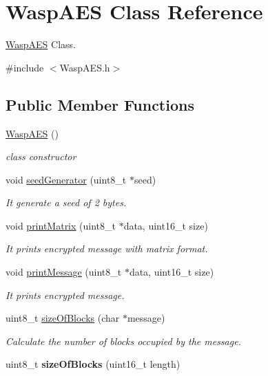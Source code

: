 \hypertarget{class_wasp_a_e_s}{}\section{Wasp\+A\+ES Class Reference}
\label{class_wasp_a_e_s}


\hyperlink{class_wasp_a_e_s}{Wasp\+A\+ES} Class.  




{\ttfamily \#include $<$Wasp\+A\+E\+S.\+h$>$}

\subsection*{Public Member Functions}
\begin{DoxyCompactItemize}
\item 
\hyperlink{class_wasp_a_e_s_a2b1ec7f2140235bf7afdb48e28346128}{Wasp\+A\+ES} ()
\begin{DoxyCompactList}\small\item\em class constructor \end{DoxyCompactList}\item 
void \hyperlink{class_wasp_a_e_s_af1dce4d0b180e349d5b9acac8cc924e6}{seed\+Generator} (uint8\+\_\+t $\ast$seed)
\begin{DoxyCompactList}\small\item\em It generate a seed of 2 bytes. \end{DoxyCompactList}\item 
void \hyperlink{class_wasp_a_e_s_a75819acddbbc5bd70e2b2c48dffabeb3}{print\+Matrix} (uint8\+\_\+t $\ast$data, uint16\+\_\+t size)
\begin{DoxyCompactList}\small\item\em It prints encrypted message with matrix format. \end{DoxyCompactList}\item 
void \hyperlink{class_wasp_a_e_s_ae2bca58e4f37a90d9ff371be45316233}{print\+Message} (uint8\+\_\+t $\ast$data, uint16\+\_\+t size)
\begin{DoxyCompactList}\small\item\em It prints encrypted message. \end{DoxyCompactList}\item 
uint8\+\_\+t \hyperlink{class_wasp_a_e_s_af32679b848814302ba9a036ece343c6b}{size\+Of\+Blocks} (char $\ast$message)
\begin{DoxyCompactList}\small\item\em Calculate the number of blocks occupied by the message. \end{DoxyCompactList}\item 
uint8\+\_\+t {\bfseries size\+Of\+Blocks} (uint16\+\_\+t length)\hypertarget{class_wasp_a_e_s_af0cde0e1a0843b6e2a9284fb1138bf26}{}\label{class_wasp_a_e_s_af0cde0e1a0843b6e2a9284fb1138bf26}


\end{DoxyCompactItemize}
